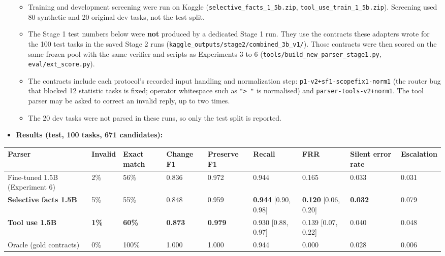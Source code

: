 \documentclass[11pt]{article}
\providecommand{\tightlist}{\setlength{\itemsep}{0pt}\setlength{\parskip}{0pt}}
\begin{document}
\begin{itemize}
  \begin{itemize}
  \tightlist
  \item
    Training and development screening were run on Kaggle
    (\texttt{selective\_\allowbreak{}facts\_\allowbreak{}1\_\allowbreak{}5b.\allowbreak{}zip},
    \texttt{tool\_\allowbreak{}use\_\allowbreak{}train\_\allowbreak{}1\_\allowbreak{}5b.\allowbreak{}zip}).
    Screening used 80 synthetic and 20 original dev tasks, not the test
    split.
  \item
    The Stage 1 test numbers below were \textbf{not} produced by a
    dedicated Stage 1 run. They use the contracts these adapters wrote
    for the 100 test tasks in the saved Stage 2 runs
    (\texttt{kaggle\_\allowbreak{}outputs/\allowbreak{}stage2/\allowbreak{}combined\_\allowbreak{}3b\_\allowbreak{}v1/\allowbreak{}}).
    Those contracts were then scored on the same frozen pool with the
    same verifier and scripts as Experiments 3 to 6
    (\texttt{tools/\allowbreak{}build\_\allowbreak{}new\_\allowbreak{}parser\_\allowbreak{}stage1.\allowbreak{}py},
    \texttt{eval/\allowbreak{}ext\_\allowbreak{}score.\allowbreak{}py}).
  \item
    The contracts include each protocol's recorded input handling and
    normalization step: \texttt{p1-v2+sf1-scopefix1-norm1} (the router
    bug that blocked 12 statistic tasks is fixed; operator whitespace
    such as \texttt{"> "} is normalised) and
    \texttt{parser-tools-v2+norm1}. The tool parser may be asked to
    correct an invalid reply, up to two times.
  \item
    The 20 dev tasks were not parsed in these runs, so only the test
    split is reported.
  \end{itemize}
\item
  \textbf{Results (test, 100 tasks, 671 candidates):}
\end{itemize}

\begin{table}[!tp]
\centering\scriptsize\setlength{\tabcolsep}{3pt}\renewcommand{\arraystretch}{1.1}
\begin{adjustbox}{max width=\textwidth}\begin{tabular}{lllllllll}
\toprule
\textbf{Parser} & \textbf{Invalid} & \textbf{Exact match} & \textbf{Change F1} & \textbf{Preserve F1} & \textbf{Recall} & \textbf{FRR} & \textbf{Silent error rate} & \textbf{Escalation} \\
\midrule
Fine-tuned 1.5B (Experiment 6) & 2\% & 56\% & 0.836 & 0.972 & 0.944 & 0.165 & 0.033 & 0.031 \\
\textbf{Selective facts 1.5B} & 5\% & 55\% & 0.848 & 0.959 & \textbf{0.944} [0.90, 0.98] & \textbf{0.120} [0.06, 0.20] & \textbf{0.032} & 0.079 \\
\textbf{Tool use 1.5B} & \textbf{1\%} & \textbf{60\%} & \textbf{0.873} & \textbf{0.979} & 0.930 [0.88, 0.97] & 0.139 [0.07, 0.22] & 0.040 & 0.048 \\
Oracle (gold contracts) & 0\% & 100\% & 1.000 & 1.000 & 0.944 & 0.000 & 0.028 & 0.006 \\
\bottomrule
\end{tabular}\end{adjustbox}
\end{table}
\end{document}
